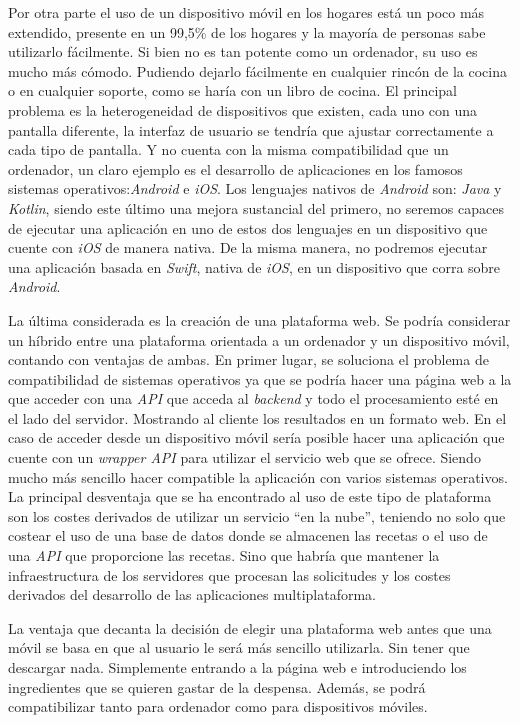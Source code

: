 Por otra parte el uso de un dispositivo móvil en los hogares está un poco más extendido, presente en un 99,5\% de los hogares y la mayoría de personas sabe utilizarlo fácilmente.\cite{ontsi2022} Si bien no es tan potente como un ordenador, su uso es mucho más cómodo. Pudiendo dejarlo fácilmente en cualquier rincón de la cocina o en cualquier soporte, como se haría con un libro de cocina. El principal problema es la heterogeneidad de dispositivos que existen, cada uno con una pantalla diferente, la interfaz de usuario se tendría que ajustar correctamente a cada tipo de pantalla. Y no cuenta con la misma compatibilidad que un ordenador, un claro ejemplo es el desarrollo de aplicaciones en los famosos sistemas operativos:\emph{Android} e \emph{iOS}. Los lenguajes nativos de \emph{Android} son: \emph{Java} y \emph{Kotlin}, siendo este último una mejora sustancial del primero, no seremos capaces de ejecutar una aplicación en uno de estos dos lenguajes en un dispositivo que cuente con \emph{iOS} de manera nativa. De la misma manera, no podremos ejecutar una aplicación basada en \emph{Swift}, nativa de \emph{iOS}, en un dispositivo que corra sobre \emph{Android}.

La última considerada es la creación de una plataforma web. Se podría considerar un híbrido entre una plataforma orientada a un ordenador y un dispositivo móvil, contando con ventajas de ambas. En primer lugar, se soluciona el problema de compatibilidad de sistemas operativos ya que se podría hacer una página web a la que acceder con una \emph{API} que acceda al \emph{backend} y todo el procesamiento esté en el lado del servidor. Mostrando al cliente los resultados en un formato web. En el caso de acceder desde un dispositivo móvil sería posible hacer una aplicación que cuente con un \emph{wrapper API} para utilizar el servicio web que se ofrece. Siendo mucho más sencillo hacer compatible la aplicación con varios sistemas operativos. La principal desventaja que se ha encontrado al uso de este tipo de plataforma son los costes derivados de utilizar un servicio ``en la nube'', teniendo no solo que costear el uso de una base de datos donde se almacenen las recetas o el uso de una \emph{API} que proporcione las recetas. Sino que habría que mantener la infraestructura de los servidores que procesan las solicitudes y los costes derivados del desarrollo de las aplicaciones multiplataforma.

La ventaja que decanta la decisión de elegir una plataforma web antes que una móvil se basa en que al usuario le será más sencillo utilizarla. Sin tener que descargar nada. Simplemente entrando a la página web e introduciendo los ingredientes que se quieren gastar de la despensa. Además, se podrá compatibilizar tanto para ordenador como para dispositivos móviles.



